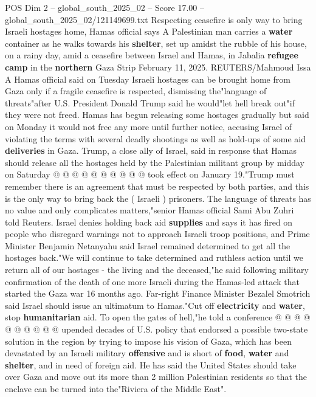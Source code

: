 \begin{textsample}{POS Dim 2 – global\_south\_2025\_02 – Score 17.00 – global\_south\_2025\_02/121149699.txt}  \label{ex:f2_pos_430}
Respecting ceasefire is only way to bring Israeli hostages home, Hamas official says A Palestinian man carries a \textbf{water} container as he walks towards his \textbf{shelter}, set up amidst the rubble of his house, on a rainy day, amid a ceasefire between Israel and Hamas, in Jabalia \textbf{refugee} \textbf{camp} in the \textbf{northern} Gaza Strip February 11, 2025.
REUTERS/Mahmoud Issa A Hamas official said on Tuesday Israeli hostages can be brought home from Gaza only if a fragile ceasefire is respected, dismissing the"language of threats"after U.S.
President Donald Trump said he would"let hell break out"if they were not freed.
Hamas has begun releasing some hostages gradually but said on Monday it would not free any more until further notice, accusing Israel of violating the terms with several deadly shootings as well as hold-ups of some aid \textbf{deliveries} in Gaza.
Trump, a close ally of Israel, said in response that Hamas should release all the hostages held by the Palestinian militant group by midday on Saturday @ @ @ @ @ @ @ @ @ @ took effect on January 19."Trump must remember there is an agreement that must be respected by both parties, and this is the only way to bring back the ( Israeli ) prisoners.
The language of threats has no value and only complicates matters,"senior Hamas official Sami Abu Zuhri told Reuters.
Israel denies holding back aid \textbf{supplies} and says it has fired on people who disregard warnings not to approach Israeli troop positions, and Prime Minister Benjamin Netanyahu said Israel remained determined to get all the hostages back."We will continue to take determined and ruthless action until we return all of our hostages - the living and the deceased,"he said following military confirmation of the death of one more Israeli during the Hamas-led attack that started the Gaza war 16 months ago.
Far-right Finance Minister Bezalel Smotrich said Israel should issue an ultimatum to Hamas."Cut off \textbf{electricity} and \textbf{water}, stop \textbf{humanitarian} aid.
To open the gates of hell,"he told a conference @ @ @ @ @ @ @ @ @ @ upended decades of U.S. policy that endorsed a possible two-state solution in the region by trying to impose his vision of Gaza, which has been devastated by an Israeli military \textbf{offensive} and is short of \textbf{food}, \textbf{water} and \textbf{shelter}, and in need of foreign aid.
He has said the United States should take over Gaza and move out its more than 2 million Palestinian residents so that the enclave can be turned into the"Riviera of the Middle East".

\end{textsample}
